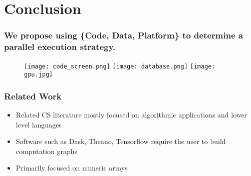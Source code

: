\documentclass{beamer}
\begin{document}
\begin{frame}[fragile]
%
%

\end{frame}
\section{Conclusion}
\begin{frame}

%
%
%

    \frametitle{We propose using \{Code, Data, Platform\} to determine a
    parallel execution strategy.}

\begin{figure}
            \texttt{[image: code\_screen.png]}
            \hfill
            \texttt{[image: database.png]}
            \hfill
            \texttt{[image: gpu.jpg]}
\end{figure}

\end{frame}
\begin{frame}

    \frametitle{Related Work}


\begin{itemize}
    \item Related CS literature mostly focused on algorithmic applications
        and lower level languages
    \item Software such as Dask, Theano, Tensorflow require the user to build
        computation graphs
    \item Primarily focused on numeric arrays
\end{itemize}

\end{frame}
\end{document}
